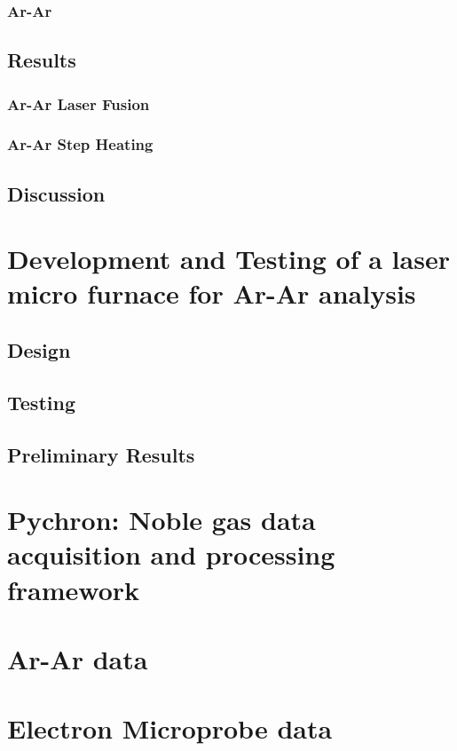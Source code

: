 \documentclass[12pt]{report}
\begin{document}
\subsection{Ar-Ar}
\section{Results}
\subsection{Ar-Ar Laser Fusion}
\subsection{Ar-Ar Step Heating}
\section{Discussion}
\chapter{Development and Testing of a laser micro furnace for Ar-Ar analysis}
\section{Design}
\section{Testing}
\section{Preliminary Results}
\chapter{Pychron: Noble gas data acquisition and processing framework}

\appendix
\chapter{Ar-Ar data}
\chapter{Electron Microprobe data}



\nocite{*} %
\end{document}
